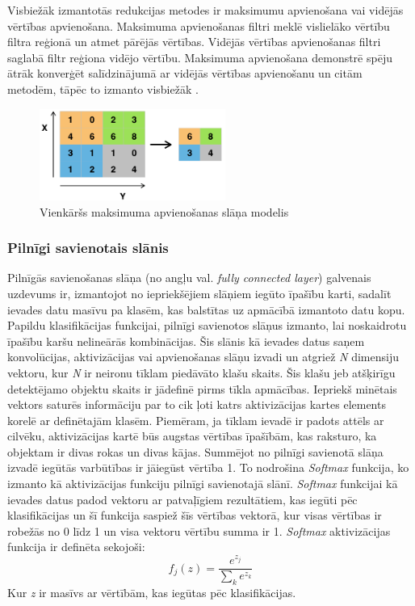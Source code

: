 Visbiežāk izmantotās redukcijas metodes ir maksimumu apvienošana vai vidējās vērtības apvienošana. Maksimuma apvienošanas filtri meklē vislielāko vērtību filtra reģionā un atmet pārējās vērtības. Vidējās vērtības apvienošanas filtri saglabā filtr reģiona vidējo vērtību. Maksimuma apvienošana demonstrē spēju ātrāk konverģēt salīdzinājumā ar vidējās vērtības apvienošanu un citām metodēm, tāpēc to izmanto visbiežāk \cite{scherer2010evaluation}. 
\begin{figure}[h]%
	\centering
	\includegraphics[height=3cm]{images/maxpool.png} %
	\caption{Vienkāršs maksimuma apvienošanas slāņa modelis \cite{maxpool}}%
	\label{fig:example}%
\end{figure}
\subsubsection{Pilnīgi savienotais slānis}
Pilnīgās savienošanas slāņa (no angļu val. \textit{fully connected layer}) galvenais uzdevums ir, izmantojot no iepriekšējiem slāņiem iegūto īpašību karti, sadalīt ievades datu masīvu pa klasēm, kas balstītas uz apmācībā izmantoto datu kopu. Papildu klasifikācijas funkcijai, pilnīgi savienotos slāņus izmanto, lai noskaidrotu īpašību karšu nelineārās kombinācijas. Šis slānis kā ievades datus saņem konvolūcijas, aktivizācijas vai apvienošanas slāņu izvadi un atgriež \textit{N} dimensiju vektoru, kur \textit{N} ir neironu tīklam piedāvāto klašu skaits. Šis klašu jeb atšķirīgu detektējamo objektu skaits ir jādefinē pirms tīkla apmācības. Iepriekš minētais vektors saturēs informāciju par to cik ļoti katrs aktivizācijas kartes elements korelē ar definētajām klasēm. Piemēram, ja tīklam ievadē ir padots attēls ar cilvēku, aktivizācijas kartē būs augstas vērtības īpašībām, kas raksturo, ka objektam ir divas rokas un divas kājas. Summējot no pilnīgi savienotā slāņa izvadē iegūtās varbūtības ir jāiegūst vērtība 1. To nodrošina \textit{Softmax} funkcija, ko izmanto kā aktivizācijas funkciju pilnīgi savienotajā slānī. \textit{Softmax} funkcijai kā ievades datus padod vektoru ar patvaļīgiem rezultātiem, kas iegūti pēc klasifikācijas un šī funkcija saspiež šīs vērtības vektorā, kur visas vērtības ir robežās no 0 līdz 1 un visa vektoru vērtību summa ir 1. \textit{Softmax} aktivizācijas funkcija ir definēta sekojoši:
\[f_j(z) = \frac{e^{z_j}}{\sum_k e^{z_k}} \]
Kur \textit{z} ir masīvs ar vērtībām, kas iegūtas pēc klasifikācijas.
